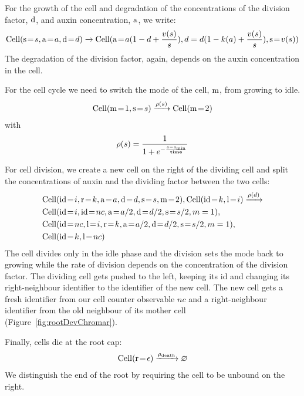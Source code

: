 For the growth of the cell and degradation of the concentrations of the division
factor, $\mathrm{d}$, and auxin concentration, $\mathrm{a}$, we write:
\begin{align*}
\mr{Cell}(\ar{s}{s}, \ar{a}{a}, \ar{d}{d}) \xrightarrow{} \mr{Cell}(\ar{a}{a (1 - d +
  \frac{v(s)}{s})}, d=d (1 - k(a) + \frac{v(s)}{s}), \ar{s}{v(s)})
\end{align*}
The degradation of the division factor, again, depends on the auxin
concentration in the cell.

For the cell cycle we need to switch the mode of the cell, $\mathrm{m}$, from
growing to idle.
\begin{align*}
  \mathrm{Cell}(\mathrm{m} \! = \! {1}, \mathrm{s} \! = \! {s}) \xrightarrow{\rho(s)} \mathrm{Cell}(\mathrm{m} \! = \! {2})
  \end{align*}
  with
  \begin{equation*}
\rho(s) = \frac{1}{1 + e^{- \frac{s-s_{\mathrm{min}}}{\mathbf{time}}}}
\end{equation*}

For cell division, we create a new cell on the right of the dividing cell and
split the concentrations of auxin and the dividing factor between the two cells:
\begin{align*}
  &\mr{Cell}(\ar{id}{i}, \ar{r}{k}, \ar{a}{a}, \ar{d}{d}, \ar{s}{s}, \ar{m}{2}),
  \mr{Cell}(\ar{id}{k}, \ar{l}{i}) \xrightarrow{\rho(d)} \\
  & \mr{Cell}(\ar{id}{i}, \ar{id}{nc}, \ar{a}{a/2}, \ar{d}{d/2}, \ar{s}{s/2},
    m=1), \\
  &  \mr{Cell}(\ar{id}{nc}, \ar{l}{i}, \ar{r}{k}, \ar{a}{a/2}, \ar{d}{d/2}, \ar{s}{s/2},
    m=1), \\
  &  \mr{Cell}(\ar{id}{k}, \ar{l}{nc})
\end{align*}
The cell divides only in the idle phase and the division sets the mode back
to growing while the rate of division depends on the concentration of the
division factor. The dividing cell gets pushed to the left, keeping its id and
changing its right-neighbour identifier to the identifier of the new cell. The
new cell gets a fresh identifier from our cell counter observable $nc$ and a
right-neighbour identifier from the old neighbour of its mother cell
(Figure~\ref{fig:rootDevChromar}).

Finally, cells die at the root cap:
\begin{align*}
\mathrm{Cell}(\mathrm{r} \! = \! {\epsilon}) \xrightarrow{\rho_{\mathrm{death}}} \varnothing
\end{align*}
We distinguish the end of the root by requiring the cell to be unbound on the
right.

